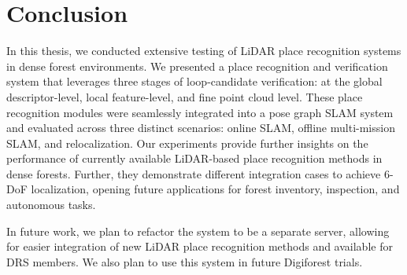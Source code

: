 \chapter{Conclusion}
\label{chap:conclusion}

In this thesis, we conducted extensive testing of LiDAR place recognition systems in dense forest environments. We presented a place recognition and verification system that leverages three stages of loop-candidate verification: at the global descriptor-level, local feature-level, and fine point cloud level. These place recognition modules were seamlessly integrated into a pose graph SLAM system and evaluated across three distinct scenarios: online SLAM, offline multi-mission SLAM, and relocalization. Our experiments provide further insights on the performance of currently available LiDAR-based place recognition methods in dense forests. Further, they demonstrate different integration cases to achieve 6-DoF localization, opening future applications for forest inventory, inspection, and autonomous tasks. 

In future work, we plan to refactor the system to be a separate server, allowing for easier integration of new LiDAR place recognition methods and available for DRS members. We also plan to use this system in future Digiforest trials. 
